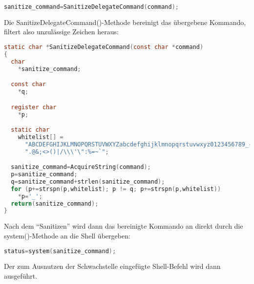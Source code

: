 \begin{lstlisting}[firstnumber=395, language=C, caption=magick/delegate.c Aufruf SanitizeDelegateCommand(),label={lst:lstlisting}]
  sanitize_command=SanitizeDelegateCommand(command);
\end{lstlisting}
\vspace{5mm}

Die SanitizeDelegateCommand()-Methode bereinigt das übergebene Kommando, filtert also unzulässige Zeichen heraus:\\

\begin{lstlisting}[firstnumber=322, language=C, caption=magick/delegate.c SanitizieDelegateCommand(),label={lst:lstlisting}]
static char *SanitizeDelegateCommand(const char *command)
{
  char
    *sanitize_command;

  const char
    *q;

  register char
    *p;

  static char
    whitelist[] =
      "ABCDEFGHIJKLMNOPQRSTUVWXYZabcdefghijklmnopqrstuvwxyz0123456789_- "
      ".@&;<>()|/\\\'\":%=~`";

  sanitize_command=AcquireString(command);
  p=sanitize_command;
  q=sanitize_command+strlen(sanitize_command);
  for (p+=strspn(p,whitelist); p != q; p+=strspn(p,whitelist))
    *p='_';
  return(sanitize_command);
}
\end{lstlisting}
\vspace{5mm}

Nach dem "`Sanitizen"' wird dann das bereinigte Kommando an direkt durch die system()-Methode an die Shell übergeben:\\

\begin{lstlisting}[firstnumber=402, language=C, caption=magick/delegate.c Aufruf system(),label={lst:lstlisting}]
  status=system(sanitize_command);
\end{lstlisting}
\vspace{5mm}

Der zum Ausnutzen der Schwachstelle eingefügte Shell-Befehl wird dann ausgeführt.